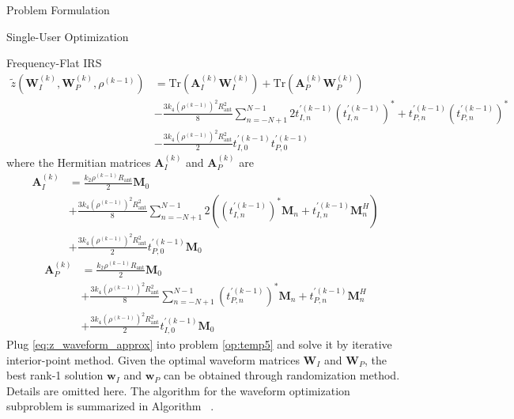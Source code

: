 \documentclass{IEEEtran}
\begin{document}
\begin{section}{Problem Formulation}
\begin{subsection}{Single-User Optimization}
\begin{subsubsection}{Frequency-Flat IRS}
\begin{equation}
				\begin{split}
					\tilde{z}(\boldsymbol{W}_I^{(k)},\boldsymbol{W}_P^{(k)},\rho^{(k-1)})
					& = \mathrm{Tr}(\boldsymbol{A}_I^{(k)}\boldsymbol{W}_I^{(k)}) + \mathrm{Tr}(\boldsymbol{A}_P^{(k)}\boldsymbol{W}_P^{(k)}) \\
					& - \frac{3 k_4 (\rho^{(k-1)})^2 R_{\text{ant}}^2}{8} \sum_{n=-N+1}^{N-1} 2t_{I,n}^{\prime (k-1)} (t_{I,n}^{\prime (k-1)})^* + t_{P,n}^{\prime (k-1)} (t_{P,n}^{\prime (k-1)})^* \\
					& - \frac{3{k_4}{(\rho^{(k-1)})^2}{R_{\text{ant}}^2}}{2} t_{I,0}^{\prime (k-1)} t_{P,0}^{\prime (k-1)}
				\end{split}
			\end{equation}
			where the Hermitian matrices $\boldsymbol{A}_I^{(k)}$ and $\boldsymbol{A}_P^{(k)}$ are
			\begin{equation}\label{eq:A_I,k}
				\begin{split}
					\boldsymbol{A}_I^{(k)}
					& = \frac{k_2 \rho^{(k-1)} R_{\text{ant}}}{2}\boldsymbol{M}_0 \\
					& + \frac{3 k_4 (\rho^{(k-1)})^2 R_{\text{ant}}^2}{8} \sum_{n=-N+1}^{N-1} 2\left((t_{I,n}^{\prime (k-1)})^*\boldsymbol{M}_{n} + t_{I,n}^{\prime (k-1)}\boldsymbol{M}_{n}^H\right) \\
					& + \frac{3{k_4}{(\rho^{(k-1)})^2}{R_{\text{ant}}^2}}{2} t_{P,0}^{\prime (k-1)}\boldsymbol{M}_{0}
				\end{split}
			\end{equation}
			\begin{equation}\label{eq:A_P,k}
				\begin{split}
					\boldsymbol{A}_P^{(k)}
					& = \frac{k_2 \rho^{(k-1)} R_{\text{ant}}}{2}\boldsymbol{M}_0 \\
					& + \frac{3 k_4 (\rho^{(k-1)})^2 R_{\text{ant}}^2}{8} \sum_{n=-N+1}^{N-1} (t_{P,n}^{\prime (k-1)})^*\boldsymbol{M}_{n} + t_{P,n}^{\prime (k-1)}\boldsymbol{M}_{n}^H \\
					& + \frac{3{k_4}{(\rho^{(k-1)})^2}{R_{\text{ant}}^2}}{2} t_{I,0}^{\prime (k-1)}\boldsymbol{M}_{0}
				\end{split}
			\end{equation}
			Plug \ref{eq:z_waveform_approx} into problem \ref{op:temp5} and solve it by iterative interior-point method. Given the optimal waveform matrices $\boldsymbol{W}_I$ and $\boldsymbol{W}_P$, the best rank-1 solution $\boldsymbol{w}_I$ and $\boldsymbol{w}_P$ can be obtained through randomization method. Details are omitted here. The algorithm for the waveform optimization subproblem is summarized in Algorithm ~.


\end{subsubsection}
\end{subsection}
\end{section}
\end{document}
